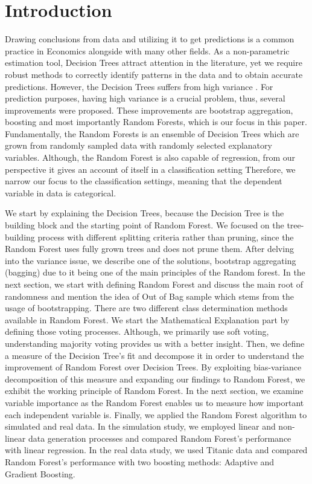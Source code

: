 \section{Introduction}
\label{ch:intro}

Drawing conclusions from data and utilizing it to get predictions is a common 
practice in Economics alongside with many other fields. 
As a non-parametric estimation tool, Decision Trees attract attention in the literature,
yet we require robust methods to correctly identify patterns in the data and to obtain accurate predictions.
However, the Decision Trees suffers from high variance \cite{friedman2001elements}. 
For prediction purposes, having high variance is a crucial problem, thus, several improvements were proposed.
These improvements are bootstrap aggregation, boosting and most importantly Random Forests, which is our focus in this paper. 
Fundamentally, the Random Forests is an ensemble of Decision Trees which are grown from randomly sampled data with 
randomly selected explanatory variables. 
Although, the Random Forest is also capable of regression, 
from our perspective it gives an account of itself in a classification setting 
Therefore, we narrow our focus to the classification settings, 
meaning that the dependent variable in data is categorical.


We start by explaining the Decision Trees, because the Decision Tree is the building block 
and the starting point of Random Forest.
We focused on the tree-building process with different splitting criteria rather than pruning, since
the Random Forest uses fully grown trees and does not prune them.
After delving into the variance issue, we describe one of the solutions, bootstrap aggregating (bagging) 
due to it being one of the main principles of the Random forest.
In the next section, we start with defining Random Forest 
and discuss the main root of randomness and mention the idea of 
Out of Bag sample which stems from the usage of bootstrapping.
There are two different class determination methods available in Random Forest. 
We start the Mathematical Explanation part by defining those voting processes. 
Although, we primarily use soft voting, understanding majority voting provides us with a better insight.
Then, we define a measure of the Decision Tree's fit and decompose it in order to 
understand the improvement of Random Forest over Decision Trees.
By exploiting bias-variance decomposition of this measure and expanding our findings to Random Forest, 
we exhibit the working principle of Random Forest.
In the next section, we examine variable importance as the Random Forest enables us to measure 
how important each independent variable is.
Finally, we applied the Random Forest algorithm to simulated and real data.
In the simulation study, we employed linear and non-linear data generation processes 
and compared Random Forest's performance with linear regression.
In the real data study, we used Titanic data \cite{titanicData} 
and compared Random Forest's performance with two boosting methods: Adaptive and Gradient Boosting.

